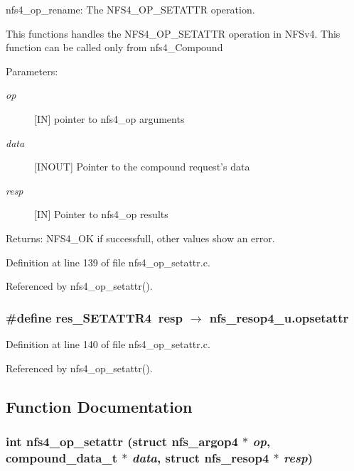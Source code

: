 nfs4\_\-op\_\-rename: The NFS4\_\-OP\_\-SETATTR operation.

This functions handles the NFS4\_\-OP\_\-SETATTR operation in NFSv4. This function can be called only from nfs4\_\-Compound

\begin{Desc}
\item[Parameters:]
\begin{description}
\item[{\em op}][IN] pointer to nfs4\_\-op arguments \item[{\em data}][INOUT] Pointer to the compound request's data \item[{\em resp}][IN] Pointer to nfs4\_\-op results\end{description}
\end{Desc}
\begin{Desc}
\item[Returns:]NFS4\_\-OK if successfull, other values show an error. \end{Desc}


Definition at line 139 of file nfs4\_\-op\_\-setattr.c.

Referenced by nfs4\_\-op\_\-setattr().
\subsubsection{\setlength{\rightskip}{0pt plus 5cm}\#define res\_\-SETATTR4\ resp $\rightarrow$ nfs\_\-resop4\_\-u.opsetattr}\label{nfs4__op__setattr_8c_a1}




Definition at line 140 of file nfs4\_\-op\_\-setattr.c.

Referenced by nfs4\_\-op\_\-setattr().

\subsection{Function Documentation}
\subsubsection{\setlength{\rightskip}{0pt plus 5cm}int nfs4\_\-op\_\-setattr (struct nfs\_\-argop4 $\ast$ {\em op}, compound\_\-data\_\-t $\ast$ {\em data}, struct nfs\_\-resop4 $\ast$ {\em resp})}\label{nfs4__op__setattr_8c_a2}




